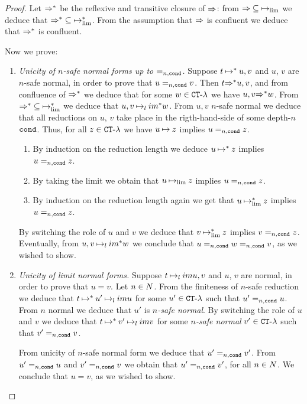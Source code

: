 \begin{proof}
Let ${\Rightarrow}^*$ be the reflexive and transitive closure of ${\Rightarrow}$:
from ${\Rightarrow} \subseteq \mathbin{\mapsto}_{\lim}$ we deduce that
${\Rightarrow}^* \subseteq \mathbin{\mapsto}_{\lim}^*$.
From the assumption that ${\Rightarrow}$ is confluent we deduce that
${\Rightarrow}^*$ is confluent. 

Now we prove:

\begin{enumerate}

\item
\emph{Unicity of $n$-safe normal forms up to $=_{n,{\tt cond}}$.}
Suppose  $t \mathbin{\mapsto}^* u,v$ and $u$, $v$ are $n$-safe normal, 
in order to prove that $u=_{n,{\tt cond}}  v$.
Then $t {\Rightarrow}^* u,v$, and from confluence of ${\Rightarrow}^*$
we deduce that for some $w \in { {\tt CT} \mbox{-} \lambda}$ we have $u,v {\Rightarrow}^* w$. 
From ${\Rightarrow}^* \subseteq \mathbin{\mapsto}_{\lim}^*$
we deduce that $u,v \mathbin{\mapsto}_lim^* w$. From $u,v$ $n$-safe normal we deduce that
all reductions on $u$, $v$ take place in the rigth-hand-side of some depth-$n$ ${\tt cond}$.
Thus, for all $z \in { {\tt CT} \mbox{-} \lambda}$ we have
 $u \mathbin{\mapsto} z$ implies $u=_{n,{\tt cond}} z$. 
\begin{enumerate} 
\item
By induction on the reduction
length we deduce $u \mathbin{\mapsto}^* z$ implies $u=_{n,{\tt cond}} z$. 
\item
By taking the limit
we obtain that $u \mathbin{\mapsto}_{\lim} z$ implies $u=_{n,{\tt cond}} z$. 
\item
By induction
on the reduction length again we get  that $u \mathbin{\mapsto}_{\lim}^* z$ implies $u=_{n,{\tt cond}} z$.
\end{enumerate}
By switching the role of $u$ and $v$ we deduce that $v \mathbin{\mapsto}_{\lim}^* z$ implies $v =_{n,{\tt cond}} z$.
Eventually, from $u,v \mathbin{\mapsto}_lim^* w$ we conclude that $u=_{n,{\tt cond}} w =_{n,{\tt cond}} v$,
as we wished to show.

\item
\emph{Unicity of limit normal forms.}
Suppose  $t \mathbin{\mapsto}_lim u,v$ and $u$, $v$ are normal, in order to prove that $u=v$.
Let $n \in {N}$.
From the finiteness of $n$-safe reduction we deduce that $t \mathbin{\mapsto}^* u' \mathbin{\mapsto}_lim u$
for some $u' \in { {\tt CT} \mbox{-} \lambda}$ such that $u' =_{n,{\tt cond}} u$. 
From $n$ normal we deduce that $u'$ is \emph{$n$-safe normal}.
By switching the role of $u$ and $v$ we deduce that 
$t \mathbin{\mapsto}^* v' \mathbin{\mapsto}_lim v$ for some \emph{$n$-safe normal} $v' \in { {\tt CT} \mbox{-} \lambda}$ 
such that $v'=_{n,{\tt cond}} v$.

From unicity of $n$-safe normal form we deduce that $u'=_{n,{\tt cond}} v'$.
From $u' =_{n,{\tt cond}} u$ and $v' =_{n,{\tt cond}} v$ we obtain that $u'=_{n,{\tt cond}} v'$, for all $n \in {N}$.
We conclude that $u=v$, as we wished to show.
\end{enumerate}
\end{proof}

